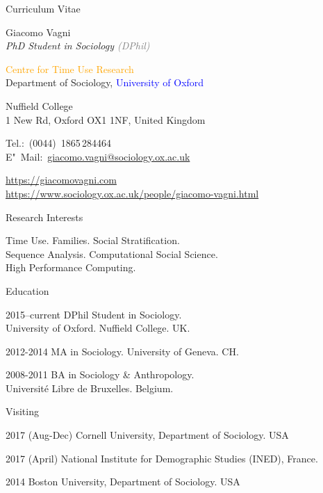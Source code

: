 \documentclass[12pt,a4paper]{article}
\begin{document}
\begin{cv}{Curriculum Vitae}
  \begin{cvlist}{}
  \item \colorbox{mygray} {Giacomo Vagni}\\
  \emph{PhD Student in Sociology \textcolor{Gray}{(DPhil)}}
  
    \textcolor{Orange} {Centre for Time Use Research} \\
     Department of Sociology, \textcolor{Blue}{University of Oxford} 
    \item Nuffield College \\ 
    1 New Rd, Oxford OX1 1NF, United Kingdom
  \item Tel.:~(0044)~1865\,284464\\
    E"~Mail:~\href{mailto:giacomo.vagni@sociology.ox.ac.uk}{giacomo.vagni@sociology.ox.ac.uk}
    
    \item \href{https://giacomovagni.com} {https://giacomovagni.com} \\ 
     \href{https://www.sociology.ox.ac.uk/people/giacomo-vagni.html} {https://www.sociology.ox.ac.uk/people/giacomo-vagni.html} \\
    
  \end{cvlist}
  
  \begin{cvlist}{Research Interests}
  \item[] Time Use. Families. Social Stratification. \\  Sequence Analysis. Computational Social Science. \\ High Performance Computing. 
  \end{cvlist}
  
  \begin{cvlist}{Education}
  \item[2015--current] DPhil Student in Sociology. \\ University of Oxford. Nuffield College. UK. 
  \item[2012-2014] MA in Sociology. University of Geneva. CH. 
  \item[2008-2011] BA in Sociology \& Anthropology. \\ Universit{\'e} Libre de Bruxelles. Belgium. 
  \end{cvlist}
  
      \begin{cvlist}{Visiting}
      	\item[2017 (Aug-Dec)] Cornell University, Department of Sociology. USA 
      	\item[2017 (April)] National Institute for Demographic Studies (INED), France. 
      	\item[2014] Boston University, Department of Sociology. USA
      \end{cvlist}
      

\end{cv}
\end{document}
